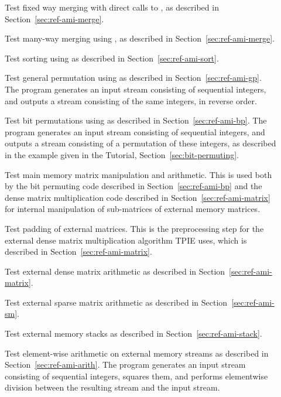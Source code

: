 \begin{description}
\item[] Test fixed way merging with direct
  calls to , as described in 
  Section~\ref{sec:ref-ami-merge}.
\item[] Test many-way merging using 
  , as described in 
  Section~\ref{sec:ref-ami-merge}.
\item[] Test sorting using  as
  described in Section~\ref{sec:ref-ami-sort}.
\item[] Test general permutation using
   as described in Section~\ref{sec:ref-ami-gp}.
The program generates an input stream
consisting of sequential integers, and outputs a stream consisting of 
the same integers, in reverse order.
\item[] Test bit permutations using
   as described in
  Section~\ref{sec:ref-ami-bp}. The program generates an input stream
consisting of sequential integers, and outputs a stream consisting of 
a permutation of these integers, as described in the example given in the Tutorial, Section~\ref{sec:bit-permuting}.
\item[]
\item[] Test main memory matrix manipulation
  and arithmetic.  This is used both by the bit permuting code
  described in Section~\ref{sec:ref-ami-bp} and the dense matrix
  multiplication code described in Section~\ref{sec:ref-ami-matrix}
  for internal manipulation of sub-matrices of external memory
  matrices.
\item[] Test padding of external
  matrices.  This is the preprocessing step for the external dense
  matrix multiplication algorithm TPIE uses, which is described in 
  Section~\ref{sec:ref-ami-matrix}. 
\item[] Test external dense matrix arithmetic
  as described in Section~\ref{sec:ref-ami-matrix}.
\item[] Test external sparse matrix arithmetic
  as described in Section~\ref{sec:ref-ami-sm}.
\item[] Test external memory stacks as
  described in Section~\ref{sec:ref-ami-stack}.
\item[] Test element-wise arithmetic on
  external memory streams as described in Section~\ref{sec:ref-ami-arith}.
The program generates an input stream
consisting of sequential integers, squares them, and performs 
elementwise division between the resulting stream and the input stream.
\end{description}


